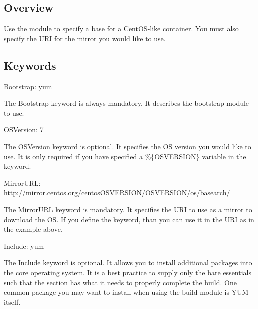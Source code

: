 \documentclass[letterpaper,10pt,english]{sphinxmanual}
\begin{document}
\subsection{Overview}
\label{\detokenize{appendix:id9}}
Use the  module to specify a base for a CentOS-like container. You must
also specify the URI for the mirror you would like to use.


\subsection{Keywords}
\label{\detokenize{appendix:id10}}
%
\begin{sphinxVerbatim}[commandchars=\\\{\}]
Bootstrap: yum
\end{sphinxVerbatim}

The Bootstrap keyword is always mandatory. It describes the bootstrap module to
use.

%
\begin{sphinxVerbatim}[commandchars=\\\{\}]
OSVersion: 7
\end{sphinxVerbatim}

The OSVersion keyword is optional. It specifies the OS version you would like to
use. It is only required if you have specified a \%\{OSVERSION\} variable in the
 keyword.

%
\begin{sphinxVerbatim}[commandchars=\\\{\}]
MirrorURL: http://mirror.centos.org/centos\PYGZhy{}\PYGZpc{}\PYGZob{}OSVERSION\PYGZcb{}/\PYGZpc{}\PYGZob{}OSVERSION\PYGZcb{}/os/\PYGZdl{}basearch/
\end{sphinxVerbatim}

The MirrorURL keyword is mandatory. It specifies the URI to use as a mirror to
download the OS. If you define the  keyword, than you can use it in
the URI as in the example above.

%
\begin{sphinxVerbatim}[commandchars=\\\{\}]
Include: yum
\end{sphinxVerbatim}

The Include keyword is optional. It allows you to install additional packages
into the core operating system. It is a best practice to supply only the bare
essentials such that the  section has what it needs to properly
complete the build. One common package you may want to install when using the
 build module is YUM itself.
\end{document}
